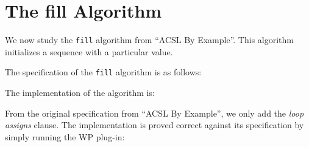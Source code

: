 \section{The \textsf{fill} Algorithm}
\label{fill}

We now study the \texttt{fill} algorithm from ``ACSL By Example''.
This algorithm initializes a sequence with a particular value.

The specification of the \texttt{fill} algorithm is as follows:


The implementation of the algorithm is:



From the original specification from ``ACSL By Example'', we only add
the \emph{loop assigns} clause.
The implementation is proved correct against its specification by
simply running the \textsf{WP} plug-in: 


